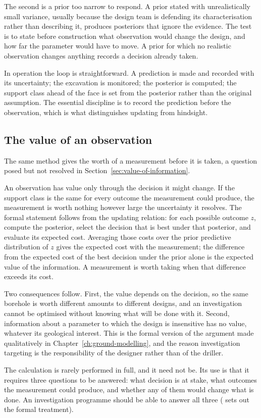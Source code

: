 The second is a prior too narrow to respond. A prior stated with unrealistically
small variance, usually because the design team is defending its
characterisation rather than describing it, produces posteriors that ignore the
evidence. The test is to state before construction what
observation would change the design, and how far the parameter would have to
move. A prior for which no realistic observation changes anything records a
decision already taken.

In operation the loop is straightforward. A prediction is made and
recorded with its uncertainty; the excavation is monitored; the posterior is
computed; the support class ahead of the face is set from the posterior rather
than the original assumption. The essential discipline is to record the
prediction before the observation, which is what distinguishes updating from
hindsight.

\subsection{The value of an observation}
\label{sec:value-of-observation}

The same method gives the worth of a measurement before it is taken, a
question posed but not resolved in
Section~\ref{sec:value-of-information}.

An observation has value only through the decision it might change. If the
support class is the same for every outcome the measurement could produce,
the measurement is worth nothing however large the uncertainty it resolves.
The formal statement follows from the updating relation: for each possible
outcome $z$, compute the posterior, select the decision that is best under
that posterior, and evaluate its expected cost. Averaging those costs over the
prior predictive distribution of $z$ gives the expected cost with the
measurement; the difference from the expected cost of the best decision under
the prior alone is the expected value of the information. A measurement is
worth taking when that difference exceeds its cost.

Two consequences follow. First, the
value depends on the decision, so the same borehole is worth different amounts
to different designs, and an investigation cannot be optimised without knowing
what will be done with it. Second, information about a parameter to which the
design is insensitive has no value, whatever its geological interest. This is the
formal version of the argument made qualitatively in
Chapter~\ref{ch:ground-modelling}, and the reason investigation targeting
is the responsibility of the designer rather than of the driller.

The calculation is rarely performed in full, and it need not be. Its use
is that it requires three questions to be answered:
what decision is at stake, what outcomes the measurement could produce, and
whether any of them would change what is done. An investigation programme
should be able to answer all three
(\citealt{baecher2003reliability} sets out the formal treatment).

\chapterreferences
